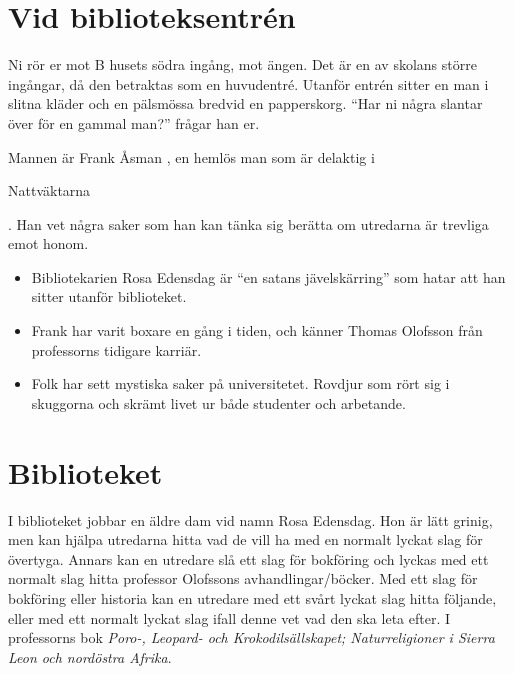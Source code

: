 \section{Vid biblioteksentrén}
\begin{displayquote}
	Ni rör er mot B husets södra ingång, mot ängen. Det är en av skolans större ingångar, 
	då den betraktas som en huvudentré. Utanför entrén sitter en man i slitna kläder och 
	en pälsmössa bredvid en papperskorg. ``Har ni några slantar över för en gammal man?'' 
	frågar han er.
\end{displayquote}

Mannen är Frank Åsman \sectiondescribe{\ref{kar:FrankAsman}}, en hemlös man som är delaktig i 
\begin{textit}Nattväktarna\end{textit}. Han vet några saker som han kan tänka sig berätta 
om utredarna är trevliga emot honom.

\begin{itemize}
	\item Bibliotekarien Rosa Edensdag är ``en satans jävelskärring'' som hatar att han 
	sitter utanför biblioteket.
	\item Frank har varit boxare en gång i tiden, och känner Thomas Olofsson från professorns tidigare karriär.
	\item Folk har sett mystiska saker på universitetet. Rovdjur som rört sig i skuggorna och skrämt livet ur
	både studenter och arbetande.
\end{itemize}


\section{Biblioteket}
I biblioteket jobbar en äldre dam vid namn Rosa Edensdag. Hon är lätt grinig, men kan hjälpa utredarna hitta vad de vill ha med en normalt lyckat slag för övertyga. Annars kan en utredare slå ett slag för bokföring och lyckas med ett normalt slag hitta professor Olofssons avhandlingar/böcker. Med ett slag för bokföring eller historia kan en utredare med ett svårt lyckat slag hitta följande, eller med ett normalt lyckat slag ifall denne vet vad den ska leta efter. I professorns bok \textit{Poro-, Leopard- och Krokodilsällskapet; Naturreligioner i Sierra Leon och nordöstra Afrika}.

